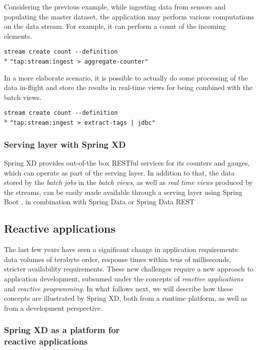 Considering the previous example, while ingesting data from sensors and 
populating the master dataset, the application may perform various computations 
on the data stream. For example, it can perform a count of the incoming elements. 

\verb;stream create count --definition  ;\\*
\verb;"tap:stream:ingest > aggregate-counter";

In a more elaborate scenario, it is possible to actually do 
some processing of the data in-flight and store the results in real-time views
for being combined with the batch views.

\verb;stream create count --definition  ;\\*
\verb;"tap:stream:ingest > extract-tags | jdbc";

\subsubsection {Serving layer with Spring XD}

Spring XD provides out-of-the box RESTful services for its counters and gauges,
which can operate as part of the serving layer. In addition to that,  
the data stored by the \emph{batch jobs} in the 
\emph{batch views}, as well as \emph{real time views} produced by the streams, 
can be easily made available through a serving layer using Spring Boot \cite{spring-boot},
in combination with Spring Data \cite{spring-data} or Spring Data REST \cite{spring-data-rest}.

\subsection {Reactive applications}

The last few years have seen a significant change in application requirements:
data volumes of terabyte order, response times within tens of milliseconds, stricter
availability requirements. These new challenges require a new approach to application
development, subsumed under the concepts of \emph{reactive applications} and \emph{reactive
programming}. In what follows next, we will describe how these concepts are
illustrated by Spring XD, both from a runtime platform, as well as from a development perspective.

\subsubsection {Spring XD as a platform for \\ reactive applications}

